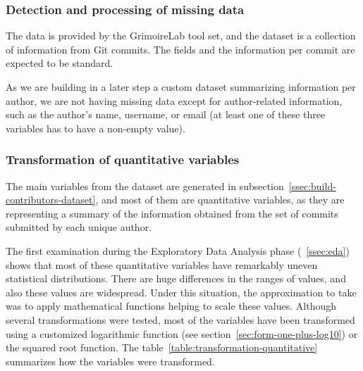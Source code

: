 \documentclass[a4paper, 12pt]{book}
\begin{document}
\subsubsection{Detection and processing of missing data}
\label{sssec:missing-data}
The data is provided by the GrimoireLab tool set, and the dataset is a collection of information from Git commits. The fields and the information per commit are expected to be standard. 

As we are building in a later step a custom dataset summarizing information per author, we are not having missing data except for author-related information, such as the author's name, username, or email (at least one of these three variables has to have a non-empty value).

\subsubsection{Transformation of quantitative variables}
\label{sssec:transformation-quantitative}

The main variables from the dataset are generated in subsection~\ref{ssec:build-contributors-dataset}, and most of them are quantitative variables, as they are representing a summary of the information obtained from the set of commits submitted by each unique author.

The first examination during the Exploratory Data Analysis phase (~\ref{ssec:eda}) shows that most of these quantitative variables have remarkably
uneven statistical distributions. There are huge differences in the ranges of values, and also these values are widespread. Under this situation, the
approximation to take was to apply mathematical functions helping to scale these values. Although several transformations were tested, most of the 
variables have been transformed using a customized logarithmic function (see section~\ref{sec:form-one-plus-log10}) or the squared root function.
The table~\ref{table:transformation-quantitative} summarizes how the variables were transformed. 
\end{document}
